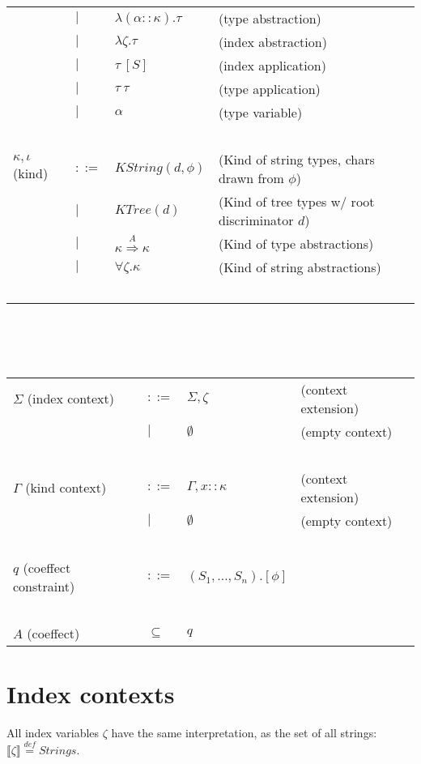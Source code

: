 \documentclass{article}
\newcommand{\sem}[1]{\llbracket #1 \rrbracket}
\newcommand{\defeq}{\overset{\mathit{def}}{=}}
\begin{document}
\begin{tabular}{llll}
       & $\mid$ & $\lambda (\alpha :: \kappa). \tau$ & (type abstraction) \\
       & $\mid$ & $\lambda \zeta. \tau$ & (index abstraction) \\
       & $\mid$ & $\tau~[S]$ & (index application) \\
       & $\mid$ & $\tau~\tau$ & (type application) \\
       & $\mid$ & $\alpha$ & (type variable) \\~\\
$\kappa, \iota$ (kind) & $::=$ & $\mathit{KString}(d,\phi)$ & (Kind of string types, chars drawn from $\phi$) \\
                       & $\mid$ & $\mathit{KTree}(d)$ & (Kind of tree types w/ root discriminator $d$) \\
                       & $\mid$ & $\kappa \overset{A}{\Rightarrow} \kappa$ & (Kind of type abstractions) \\
                       & $\mid$ & $\forall \zeta. \kappa$ & (Kind of string abstractions) \\~\\
\end{tabular}\\~\\~\\
\begin{tabular}{llll}
$\Sigma$ (index context) & $::=$ & $\Sigma,\zeta$ & (context extension) \\
                         & $\mid$ & $\emptyset$ & (empty context) \\~\\
$\Gamma$ (kind context) & $::=$ & $\Gamma,x :: \kappa$ & (context extension) \\
                           & $\mid$ & $\emptyset$ & (empty context) \\~\\
$q$ (coeffect constraint)  & $::=$ & $(S_1,\ldots,S_n).[\phi]$ & ~ \\~\\ 
$A$ (coeffect) & $\subseteq$ & $q$ & ~ 
\end{tabular}

\section*{Index contexts}

All index variables $\zeta$ have the same interpretation, as the set of all strings: $\sem{\zeta} \defeq \mathit{Strings}$.
\end{document}
